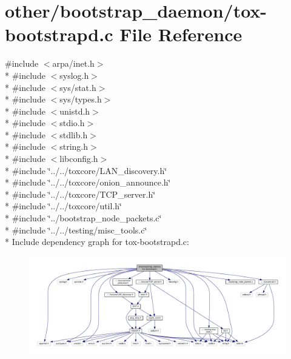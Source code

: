 \hypertarget{tox-bootstrapd_8c}{\section{other/bootstrap\+\_\+daemon/tox-\/bootstrapd.c File Reference}
\label{tox-bootstrapd_8c}
}
{\ttfamily \#include $<$arpa/inet.\+h$>$}\\*
{\ttfamily \#include $<$syslog.\+h$>$}\\*
{\ttfamily \#include $<$sys/stat.\+h$>$}\\*
{\ttfamily \#include $<$sys/types.\+h$>$}\\*
{\ttfamily \#include $<$unistd.\+h$>$}\\*
{\ttfamily \#include $<$stdio.\+h$>$}\\*
{\ttfamily \#include $<$stdlib.\+h$>$}\\*
{\ttfamily \#include $<$string.\+h$>$}\\*
{\ttfamily \#include $<$libconfig.\+h$>$}\\*
{\ttfamily \#include \char`\"{}../../toxcore/\+L\+A\+N\+\_\+discovery.\+h\char`\"{}}\\*
{\ttfamily \#include \char`\"{}../../toxcore/onion\+\_\+announce.\+h\char`\"{}}\\*
{\ttfamily \#include \char`\"{}../../toxcore/\+T\+C\+P\+\_\+server.\+h\char`\"{}}\\*
{\ttfamily \#include \char`\"{}../../toxcore/util.\+h\char`\"{}}\\*
{\ttfamily \#include \char`\"{}../bootstrap\+\_\+node\+\_\+packets.\+c\char`\"{}}\\*
{\ttfamily \#include \char`\"{}../../testing/misc\+\_\+tools.\+c\char`\"{}}\\*
Include dependency graph for tox-\/bootstrapd.c\+:
\nopagebreak
\begin{figure}[H]
\begin{center}
\leavevmode
\includegraphics[width=350pt]{de/df4/tox-bootstrapd_8c__incl}
\end{center}
\end{figure}
